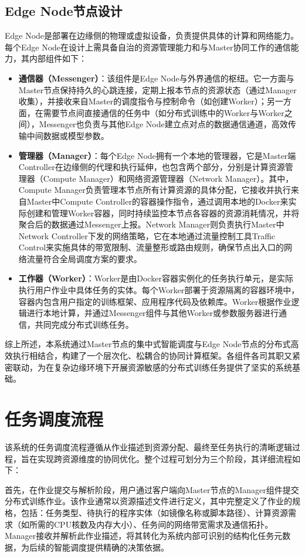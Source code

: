 \subsection{Edge Node节点设计}
Edge Node是部署在边缘侧的物理或虚拟设备，负责提供具体的计算和网络能力。每个Edge Node在设计上需具备自治的资源管理能力和与Master协同工作的通信能力，其内部组件如下：
\begin{itemize}
\item \textbf{通信器（Messenger）}：该组件是Edge Node与外界通信的枢纽。它一方面与Master节点保持持久的心跳连接，定期上报本节点的资源状态（通过Manager收集），并接收来自Master的调度指令与控制命令（如创建Worker）；另一方面，在需要节点间直接通信的任务中（如分布式训练中的Worker与Worker之间），Messenger也负责与其他Edge Node建立点对点的数据通信通道，高效传输中间数据或模型参数。
\item \textbf{管理器（Manager）}：每个Edge Node拥有一个本地的管理器，它是Master端Controller在边缘侧的代理和执行延伸，也包含两个部分，分别是计算资源管理器（Compute Manager）和网络资源管理器（Network Manager）。其中，Compute Manager负责管理本节点所有计算资源的具体分配，它接收并执行来自Master中Compute Controller的容器操作指令，通过调用本地的Docker来实际创建和管理Worker容器，同时持续监控本节点各容器的资源消耗情况，并将聚合后的数据通过Messenger上报。Network Manager则负责执行Master中Network Controller下发的网络策略，它在本地通过流量控制工具Traffic Control来实施具体的带宽限制、流量整形或路由规则，确保节点出入口的网络流量符合全局调度方案的要求。
\item \textbf{工作器（Worker）}：Worker是由Docker容器实例化的任务执行单元，是实际执行用户作业中具体任务的实体。每个Worker部署于资源隔离的容器环境中，容器内包含用户指定的训练框架、应用程序代码及依赖库。Worker根据作业逻辑进行本地计算，并通过Messenger组件与其他Worker或参数服务器进行通信，共同完成分布式训练任务。
\end{itemize}

综上所述，本系统通过Master节点的集中式智能调度与Edge Node节点的分布式高效执行相结合，构建了一个层次化、松耦合的协同计算框架。各组件各司其职又紧密联动，为在复杂边缘环境下开展资源敏感的分布式训练任务提供了坚实的系统基础。

\section{任务调度流程}
该系统的任务调度流程遵循从作业描述到资源分配、最终至任务执行的清晰逻辑过程，旨在实现跨资源维度的协同优化。整个过程可划分为三个阶段，其详细流程如下：

首先，在作业提交与解析阶段，用户通过客户端向Master节点的Manager组件提交分布式训练作业。该作业通常以资源描述文件进行定义，其中完整定义了作业的规格，包括：任务类型、待执行的程序实体（如镜像名称或脚本路径）、计算资源需求（如所需的CPU核数及内存大小）、任务间的网络带宽需求及通信拓扑。Manager接收并解析此作业描述，将其转化为系统内部可识别的结构化任务元数据，为后续的智能调度提供精确的决策依据。

